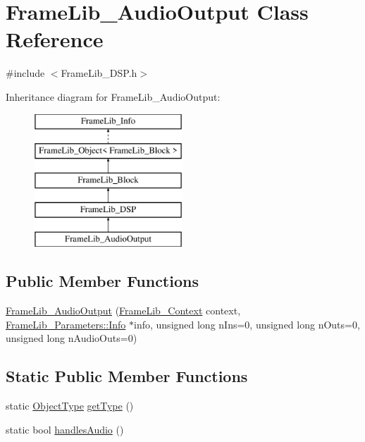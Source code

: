 \hypertarget{class_frame_lib___audio_output}{}\section{Frame\+Lib\+\_\+\+Audio\+Output Class Reference}
\label{class_frame_lib___audio_output}


{\ttfamily \#include $<$Frame\+Lib\+\_\+\+D\+S\+P.\+h$>$}

Inheritance diagram for Frame\+Lib\+\_\+\+Audio\+Output\+:\begin{figure}[H]
\begin{center}
\leavevmode
\includegraphics[height=5.000000cm]{class_frame_lib___audio_output}
\end{center}
\end{figure}
\subsection*{Public Member Functions}
\begin{DoxyCompactItemize}
\item 
\hyperlink{class_frame_lib___audio_output_a80e661b08a8daa5a18b44df01f8d4226}{Frame\+Lib\+\_\+\+Audio\+Output} (\hyperlink{class_frame_lib___context}{Frame\+Lib\+\_\+\+Context} context, \hyperlink{class_frame_lib___parameters_1_1_info}{Frame\+Lib\+\_\+\+Parameters\+::\+Info} $\ast$info, unsigned long n\+Ins=0, unsigned long n\+Outs=0, unsigned long n\+Audio\+Outs=0)
\end{DoxyCompactItemize}
\subsection*{Static Public Member Functions}
\begin{DoxyCompactItemize}
\item 
static \hyperlink{_frame_lib___types_8h_a842c5e2e69277690b064bf363c017980}{Object\+Type} \hyperlink{class_frame_lib___audio_output_a99908793774ac5046c3e369bc9a19259}{get\+Type} ()
\item 
static bool \hyperlink{class_frame_lib___audio_output_a394659d38e6e48418faf75bbae4cbc01}{handles\+Audio} ()
\end{DoxyCompactItemize}
